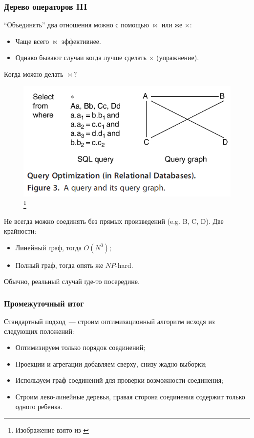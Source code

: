 \documentclass{beamer}
\begin{document}
\begin{frame}
\frametitle{Дерево операторов III}

\scriptsize  
``Объединять'' два отношения можно с помощью $\bowtie$ или же $\times$:

\begin{itemize}
	\item Чаще всего $\bowtie$ эффективнее.
	\item Однако бывают случаи когда лучше сделать $\times$ (упражнение).
\end{itemize}

Когда можно делать $\bowtie$?

\begin{figure}[htb]
\includegraphics[width=\textwidth,height=0.3\textheight,keepaspectratio]{cross.png} 
\footnote{\tiny{Изображение взято из \cite{Neumann2009}}}
\end{figure}

Не всегда можно соединять без прямых произведений (e.g. B, C, D). Две крайности:

\begin{itemize}
  \item Линейный граф, тогда $O(N^3)$;
  \item Полный граф, тогда опять же $NP$-hard.
\end{itemize}

Обычно, реальный случай где-то посередине.

\normalsize

\end{frame}

\begin{frame}
\frametitle{Промежуточный итог}

Стандартный подход~--- строим оптимизационный алгоритм исходя из следующих положений:

\begin{itemize}
  \setlength\itemsep{1em}
  \item Оптимизируем только порядок соединений;
  \item Проекции и агрегации добавляем сверху, снизу жадно выборки;
  \item Используем граф соединений для проверки возможности соединения;
  \item Строим \alert{лево-линейные деревья}, правая сторона соединения содержит только одного ребенка.
\end{itemize}

\end{frame}
\end{document}
